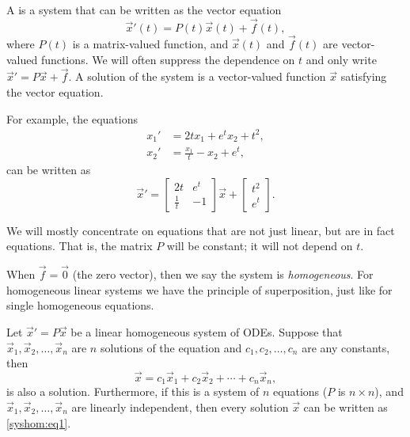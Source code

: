 \documentclass{ximera}
\begin{document}
A \emph{} is a system that can be written as the vector equation
\begin{equation*}
    {\vec{x}}'(t) = P(t)\vec{x}(t) + \vec{f}(t),
\end{equation*}
where $P(t)$ is a matrix-valued function, and $\vec{x}(t)$ and $\vec{f}(t)$ are vector-valued functions. We will often suppress the dependence on $t$ and only write ${\vec{x}}' = P\vec{x} + \vec{f}$.  A solution of the system is a vector-valued function $\vec{x}$ satisfying the vector equation.

For example, the equations
\begin{align*}
    x_1' &= 2t x_1 + e^t x_2 + t^2 , \\
    x_2' &= \frac{x_1}{t} -x_2 + e^t ,
\end{align*}
can be written as
\begin{equation*}
    {\vec{x}}' = 
    \begin{bmatrix}
        2t & e^t \\
        \frac{1}{t} & -1
    \end{bmatrix}
    \vec{x} +
    \begin{bmatrix}
        t^2 \\
        e^t
    \end{bmatrix} .
\end{equation*}

We will mostly concentrate on equations that are not just linear, but are in fact \emph{} equations.  That is, the matrix $P$ will be constant; it will not depend on $t$.


When $\vec{f} = \vec{0}$ (the zero vector), then we say the system is \emph{homogeneous}. For homogeneous linear systems we have the principle of superposition, just like for single homogeneous equations.

\begin{theorem}[Superposition]
    Let ${\vec{x}}' = P\vec{x}$ be a linear homogeneous system of ODEs.  Suppose that $\vec{x}_1,\vec{x}_2,\ldots,\vec{x}_n$ are $n$ solutions of the equation and $c_1,c_2,\ldots,c_n$ are any constants, then
    \begin{equation} 
        \label{syshom:eq1}
        \vec{x} = c_1 \vec{x}_1 + c_2 \vec{x}_2 + \cdots + c_n \vec{x}_n ,
    \end{equation}
    is also a solution. Furthermore, if this is a system of $n$ equations ($P$ is $n\times n$), and $\vec{x}_1,\vec{x}_2,\ldots,\vec{x}_n$ are linearly independent, then every solution  $\vec{x}$ can be written as \eqref{syshom:eq1}.
\end{theorem}
\end{document}
